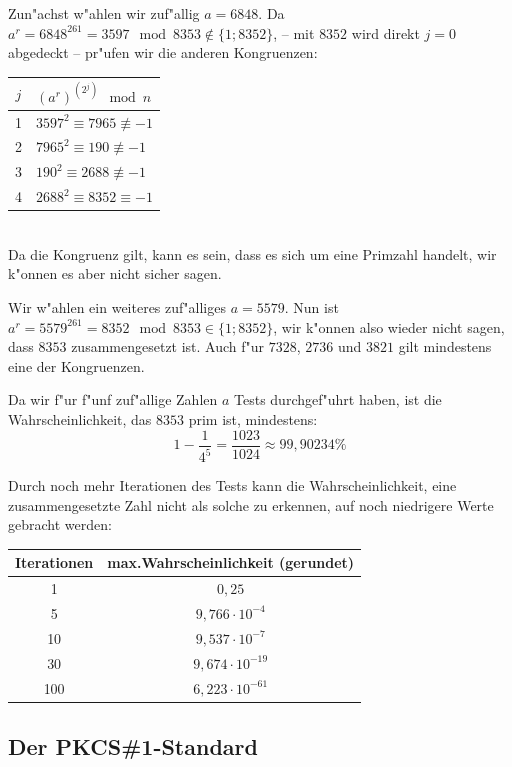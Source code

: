 \documentclass[12pt]{article}
\begin{document}
Zun"achst w"ahlen wir zuf"allig $a = 6848$.
Da $a^r = 6848^{261} = 3597 \mod 8353 \not\in \{1; 8352\}$,
-- mit $8352$ wird direkt $j = 0$ abgedeckt --
pr"ufen wir die anderen Kongruenzen:\\

\begin{tabular}{c|l}
    $j$ & $(a^r)^{(2^j)} \mod n$ \\
    \hline
    1 & $3597^2 \equiv 7965 \not\equiv -1$ \\
    2 & $7965^2 \equiv 190 \not\equiv -1$ \\
    3 & $190^2 \equiv 2688 \not\equiv -1$ \\
    4 & $2688^2 \equiv 8352 \equiv -1$ \\
\end{tabular} \\

\noindent
Da die Kongruenz gilt, kann es sein, dass es sich um eine Primzahl handelt,
wir k"onnen es aber nicht sicher sagen.

Wir w"ahlen ein weiteres zuf"alliges $a = 5579$.
Nun ist $a^r = 5579^{261} = 8352 \mod 8353 \in \{1; 8352\}$,
wir k"onnen also wieder nicht sagen, dass $8353$ zusammengesetzt ist.
Auch f"ur $7328$, $2736$ und $3821$ gilt mindestens eine der Kongruenzen.

Da wir f"ur f"unf zuf"allige Zahlen $a$ Tests durchgef"uhrt haben,
ist die Wahrscheinlichkeit, das $8353$ prim ist, mindestens:
\[1 - \frac{1}{4^5} = \frac{1023}{1024} \approx 99,90234 \% \]

Durch noch mehr Iterationen des Tests kann die Wahrscheinlichkeit,
eine zusammengesetzte Zahl nicht als solche zu erkennen,
auf noch niedrigere Werte gebracht werden:\\

\begin{tabular}{c|c}
    Iterationen & max.\@ Wahrscheinlichkeit (gerundet) \\
    \hline
    1 & $0,25$ \\
    5 & $9,766 \cdot 10^{-4}$ \\
    10 & $9,537 \cdot 10^{-7}$ \\
    30 & $9,674 \cdot 10^{-19}$ \\
    100 & $6,223 \cdot 10^{-61}$ \\
\end{tabular}

\subsection{Der PKCS\#1-Standard}
\end{document}
